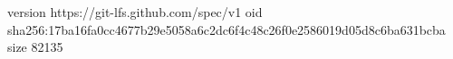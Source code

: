 version https://git-lfs.github.com/spec/v1
oid sha256:17ba16fa0cc4677b29e5058a6c2dc6f4c48c26f0e2586019d05d8c6ba631bcba
size 82135
